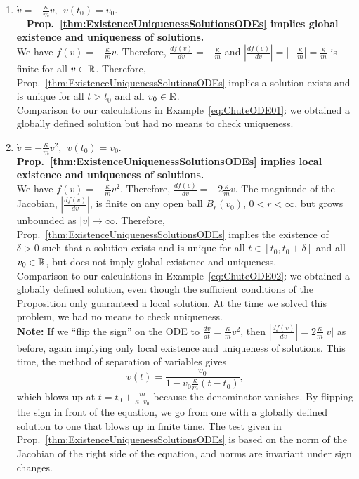 \begin{enumerate}
\renewcommand{\labelenumi}{(\alph{enumi})}
\setlength{\itemsep}{.2cm}
\item  $\dot{v} =  - \frac{\kappa}{m} v, ~~v(t_0) = v_0$. \quad \Ans~~\textbf{Prop.~\ref{thm:ExistenceUniquenessSolutionsODEs} implies global existence and uniqueness of solutions.} \\

We have $f(v) =  - \frac{\kappa}{m} v$. Therefore, $\frac{df(v)}{dv} = - \frac{\kappa}{m} $ and $|\frac{df(v)}{dv}| =|- \frac{\kappa}{m} | = \frac{\kappa}{m}$ is finite for all $v\in \mathbb R$. Therefore, 
Prop.~\ref{thm:ExistenceUniquenessSolutionsODEs} implies a solution exists and is unique for all $t>t_0$ and all $v_0 \in \mathbb R$.\\

Comparison to our calculations in Example~\ref{eq:ChuteODE01}: we obtained a globally defined solution but had no means to check uniqueness. 

\item $\dot{v} =  - \frac{\kappa}{m} v^2, ~~v(t_0) = v_0$. \Ans~ \textbf{Prop.~\ref{thm:ExistenceUniquenessSolutionsODEs} implies local existence and uniqueness of solutions.} \\

We have $f(v) =  - \frac{\kappa}{m} v^2$. Therefore, $\frac{df(v)}{dv} = - 2 \frac{\kappa}{m} v$. The magnitude of the Jacobian, $|\frac{df(v)}{dv}|$, is finite on any open ball $B_r(v_0)$, $0 < r < \infty$, but grows unbounded as $|v| \to \infty$. Therefore, 
Prop.~\ref{thm:ExistenceUniquenessSolutionsODEs} implies the existence of $\delta>0$ such that a solution exists and is unique for all $t \in[t_0, t_0+\delta]$ and all $v_0 \in \mathbb R$, but does not imply global existence and uniqueness.\\

Comparison to our calculations in Example~\ref{eq:ChuteODE02}: we obtained a globally defined solution, even though the sufficient conditions of the Proposition only guaranteed a local solution. At the time we solved this problem, we had no means to check uniqueness. \\

\textbf{Note:} If we ``flip the sign'' on the ODE to $\frac{dv}{dt} =  \frac{\kappa}{m} v^2$, then $|\frac{df(v)}{dv}| =2 \frac{\kappa}{m} | v|$ as before, again implying only local existence and uniqueness of solutions. This time, the method of separation of variables gives
$$v(t) = \frac{v_0}{1 - v_0  \frac{\kappa}{m} (t-t_0)}, $$
which blows up at $t=t_0 + \frac{m}{\kappa \cdot v_0}$ because the denominator vanishes. By flipping the sign in front of the equation, we go from one with a globally defined solution to one that blows up in finite time. The test given in Prop.~\ref{thm:ExistenceUniquenessSolutionsODEs} is based on the norm of the Jacobian of the right side of the equation, and norms are invariant under sign changes. 


\end{enumerate}
